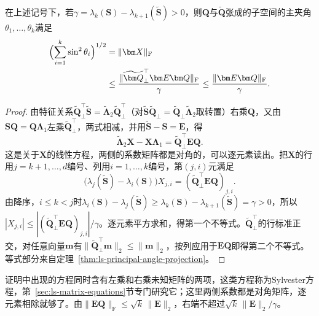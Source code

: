 \begin{theorem}[特征子空间偏转的Frobenius界]
\label{thm:ls-gap-subspace-frobenius}
在上述记号下，若$\gamma=\lambda_k(\bm S)-\lambda_{k+1}(\widetilde{\bm S})>0$，则$\bm Q$与$\widetilde{\bm Q}$张成的子空间的主夹角$\theta_1,\ldots,\theta_k$满足
\[
 \begin{aligned}
 \Bigl(\sum_{i=1}^k\sin^2\theta_i\Bigr)^{1/2}
 &=\lVert\bm X\rVert_{\mathrm F}\\
 &\leq\frac{\lVert\widetilde{\bm Q}_\perp^\top\bm E\bm Q\rVert_{\mathrm F}}{\gamma}
 \leq\frac{\lVert\bm E\bm Q\rVert_{\mathrm F}}{\gamma}.
 \end{aligned}
\]
\end{theorem}
\begin{proof}
由特征关系$\widetilde{\bm Q}_\perp^\top\widetilde{\bm S}=\widetilde{\bm\Lambda}_2\widetilde{\bm Q}_\perp^\top$（对$\widetilde{\bm S}\widetilde{\bm Q}_\perp=\widetilde{\bm Q}_\perp\widetilde{\bm\Lambda}_2$取转置）右乘$\bm Q$，又由$\bm S\bm Q=\bm Q\bm\Lambda_1$左乘$\widetilde{\bm Q}_\perp^\top$，两式相减，并用$\widetilde{\bm S}-\bm S=\bm E$，得
\[
 \widetilde{\bm\Lambda}_2\bm X-\bm X\bm\Lambda_1=\widetilde{\bm Q}_\perp^\top\bm E\bm Q .
\]
这是关于$\bm X$的线性方程，两侧的系数矩阵都是对角的，可以逐元素读出。把$\bm X$的行用$j=k+1,\ldots,d$编号、列用$i=1,\ldots,k$编号，第$(j,i)$元满足
\[
 \bigl(\lambda_j(\widetilde{\bm S})-\lambda_i(\bm S)\bigr)X_{j,i}=(\widetilde{\bm Q}_\perp^\top\bm E\bm Q)_{j,i}.
\]
由降序，$i\leq k<j$时$\lambda_i(\bm S)-\lambda_j(\widetilde{\bm S})\geq\lambda_k(\bm S)-\lambda_{k+1}(\widetilde{\bm S})=\gamma>0$，所以$|X_{j,i}|\leq|(\widetilde{\bm Q}_\perp^\top\bm E\bm Q)_{j,i}|/\gamma$。逐元素平方求和，得第一个不等式。$\widetilde{\bm Q}_\perp^\top$的行标准正交，对任意向量$\bm m$有$\lVert\widetilde{\bm Q}_\perp^\top\bm m\rVert_2\leq\lVert\bm m\rVert_2$，按列应用于$\bm E\bm Q$即得第二个不等式。等式部分来自定理~\ref{thm:ls-principal-angle-projection}。
\end{proof}
证明中出现的方程同时含有左乘和右乘未知矩阵的两项，这类方程称为Sylvester方程，第~\ref{sec:ls-matrix-equations}节专门研究它；这里两侧系数都是对角矩阵，逐元素相除就够了。由$\lVert\bm E\bm Q\rVert_{\mathrm F}\leq\sqrt k\,\lVert\bm E\rVert_2$，右端不超过$\sqrt k\,\lVert\bm E\rVert_2/\gamma$。

